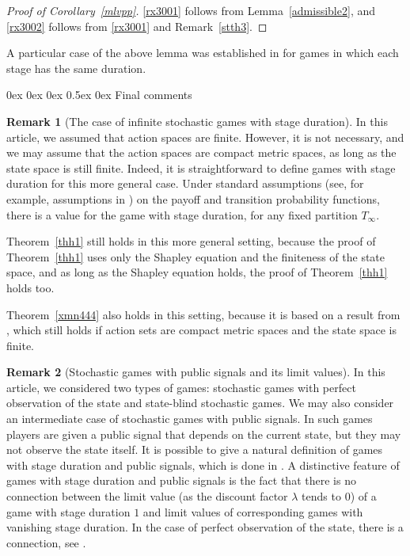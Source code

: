 \documentclass[english,openary,12pt]{article}
\makeatletter
\renewcommand\section{\@startsection {section}{1}{\z@}%
                                   {0ex \@plus 0ex \@minus 0ex}%
                                   {0.5ex \@plus0ex}%
                                   {\normalfont\LARGE\bfseries}}%
\theoremstyle{definition}
\newtheorem{remark}{Remark}
\newcommand{\N}{\mathbb{N}}
\makeatother
\begin{document}
\begin{proof}[Proof of Corollary~\ref{mlvpp}]
	\eqref{rx3001} follows from Lemma~\ref{admissible2}, and 
	\eqref{rx3002} follows from \eqref{rx3001} and Remark~\ref{stth3}.
\end{proof}

A particular case of the above lemma was established in \cite{Ney13} for games in which each stage has the same duration. 

\section{Final comments}
\label{the_final}

\begin{remark}[The case of infinite stochastic games with stage duration]
In this article, we assumed that action spaces are finite. However, it is not necessary, and we may assume that the action spaces are compact metric spaces, as long as the state space is still finite. Indeed, it is straightforward to define games with stage duration for this more general case. Under standard assumptions (see, for example, assumptions in \cite{Sor02}) on the payoff and transition probability functions, there is a value for the game with stage duration, for any fixed partition $T_\infty$.

Theorem~\ref{thh1} still holds in this more general setting, because 
the proof of Theorem~\ref{thh1} uses only the Shapley equation and the finiteness of the state space, and as long as the Shapley equation holds, the proof of Theorem~\ref{thh1} holds too.

Theorem~\ref{xmn444} also holds in this setting, because
it is based on a result from \cite{Sor17}, which still holds if action sets are compact metric spaces and the state space is finite.
\end{remark}


\begin{remark}[Stochastic games with public signals and its limit values]
\label{great_apple}
In this article, we considered two types of games: stochastic 
games with perfect observation of the state and state-blind stochastic games.
We may also consider an intermediate case of stochastic games with public 
signals. In such games players are given a public signal that depends on 
the current state, but they may not observe the state itself.
It is possible to give a natural definition of games 
with stage duration and public signals, which is done in \cite{Nov24}.
A distinctive feature of games with stage duration and public signals is the fact that there is no connection between the limit value (as the discount factor $\lambda$ tends to $0$) of a game with stage duration $1$ and limit values of corresponding games with vanishing stage duration. In the case of perfect observation of the state, there is a connection, see \cite[\S7.3]{SorVig16}.
\end{remark}
\end{document}
